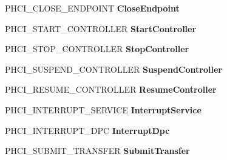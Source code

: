 \begin{DoxyCompactItemize}
P\+H\+C\+I\+\_\+\+C\+L\+O\+S\+E\+\_\+\+E\+N\+D\+P\+O\+I\+NT {\bfseries Close\+Endpoint}
\item 
\mbox{\label{struct___u_s_b_p_o_r_t___r_e_g_i_s_t_r_a_t_i_o_n___p_a_c_k_e_t_ad41cc7e5a7a0b4979bdd9a46625f375e}} 
P\+H\+C\+I\+\_\+\+S\+T\+A\+R\+T\+\_\+\+C\+O\+N\+T\+R\+O\+L\+L\+ER {\bfseries Start\+Controller}
\item 
\mbox{\label{struct___u_s_b_p_o_r_t___r_e_g_i_s_t_r_a_t_i_o_n___p_a_c_k_e_t_a0b41629bfcb593dc881cbd54021dc1c7}} 
P\+H\+C\+I\+\_\+\+S\+T\+O\+P\+\_\+\+C\+O\+N\+T\+R\+O\+L\+L\+ER {\bfseries Stop\+Controller}
\item 
\mbox{\label{struct___u_s_b_p_o_r_t___r_e_g_i_s_t_r_a_t_i_o_n___p_a_c_k_e_t_a9633376c0116c384cfa5e25b28458850}} 
P\+H\+C\+I\+\_\+\+S\+U\+S\+P\+E\+N\+D\+\_\+\+C\+O\+N\+T\+R\+O\+L\+L\+ER {\bfseries Suspend\+Controller}
\item 
\mbox{\label{struct___u_s_b_p_o_r_t___r_e_g_i_s_t_r_a_t_i_o_n___p_a_c_k_e_t_aa32f4b2147e4481d1c4a757ae777657a}} 
P\+H\+C\+I\+\_\+\+R\+E\+S\+U\+M\+E\+\_\+\+C\+O\+N\+T\+R\+O\+L\+L\+ER {\bfseries Resume\+Controller}
\item 
\mbox{\label{struct___u_s_b_p_o_r_t___r_e_g_i_s_t_r_a_t_i_o_n___p_a_c_k_e_t_ad3e1269661ba526ca62548f8e672da1c}} 
P\+H\+C\+I\+\_\+\+I\+N\+T\+E\+R\+R\+U\+P\+T\+\_\+\+S\+E\+R\+V\+I\+CE {\bfseries Interrupt\+Service}
\item 
\mbox{\label{struct___u_s_b_p_o_r_t___r_e_g_i_s_t_r_a_t_i_o_n___p_a_c_k_e_t_adce227b6ec93c8fe466421aea5e5b37c}} 
P\+H\+C\+I\+\_\+\+I\+N\+T\+E\+R\+R\+U\+P\+T\+\_\+\+D\+PC {\bfseries Interrupt\+Dpc}
\item 
\mbox{\label{struct___u_s_b_p_o_r_t___r_e_g_i_s_t_r_a_t_i_o_n___p_a_c_k_e_t_a13d0d0bd28652b56033b19095251ae3e}} 
P\+H\+C\+I\+\_\+\+S\+U\+B\+M\+I\+T\+\_\+\+T\+R\+A\+N\+S\+F\+ER {\bfseries Submit\+Transfer}

\end{DoxyCompactItemize}
